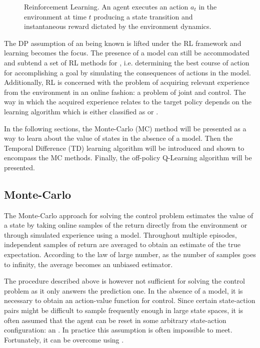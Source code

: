 \begin{figure}
  \centering
  
  \caption{Reinforcement Learning. An agent executes an action $a_t$ in the
  environment at time $t$ producing a state transition and instantaneous reward
  dictated by the environment dynamics.}
  \label{fig:rl}
\end{figure}

The DP assumption of an  being known is
lifted under the RL framework and  learning becomes the focus. The presence
of a model can still be accommodated and subtend a set of RL
methods for , i.e. determining the best course of action for
accomplishing a goal by simulating the consequences of actions in the model.
Additionally, RL is concerned with the problem of acquiring relevant experience
from the environment in an online fashion: a problem of joint
 and control. The way in which the acquired experience relates
to the target policy depends on the learning algorithm which is either
classified as  or .

 In the following sections, the Monte-Carlo (MC) method will be presented as a way to learn about the value of states in the absence of a model. Then the Temporal Difference (TD) learning algorithm will be introduced and shown to encompass the MC methods. Finally, the off-policy Q-Learning algorithm will be presented. 

\subsection{Monte-Carlo}
The Monte-Carlo approach for solving the control problem estimates the value
of a state by taking online samples of the return directly from the
environment or through simulated experience using a model. Throughout multiple episodes, independent samples of return are averaged to
obtain an estimate of the true expectation. According to the law of large number, as
the number of samples goes to infinity, the average becomes an unbiased
estimator. 

The procedure described above is however not sufficient for solving the control
problem as it only answers the prediction one. In the absence of a model, it is
necessary to obtain an action-value function for control. Since certain state-action pairs might be difficult to sample frequently enough in large state spaces, it
is often assumed that the agent can be reset in some arbitrary state-action
configuration: an . In practice this assumption is often impossible to meet.  Fortunately, it can be overcome using .

